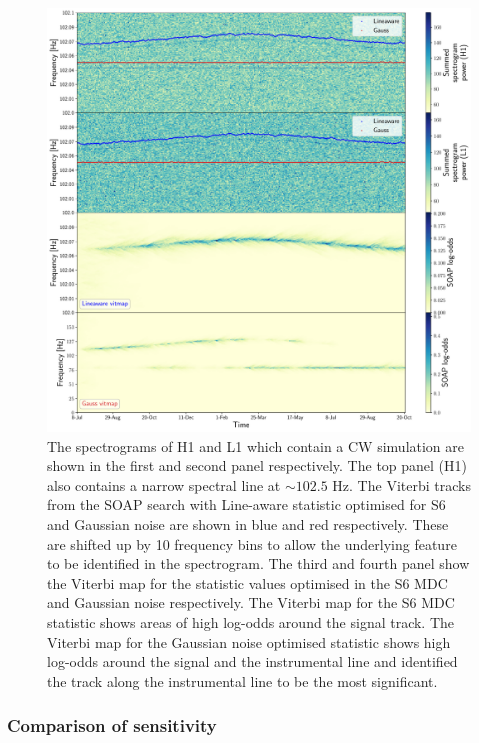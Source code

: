 \begin{figure}[h]
    \centering
    \includegraphics[width=1.0\linewidth]{C3_soap/line_example.pdf}
	\caption[Example of improvements when using optimised parameters for line aware statistic.]{ The spectrograms of H1 and L1 which contain a \gls{CW} simulation are shown in the first and second panel respectively. The top panel (H1) also contains a narrow spectral line at $\sim 102.5$ Hz.
	The Viterbi tracks from the SOAP search with Line-aware statistic optimised for S6 and Gaussian noise are shown in blue and red respectively. These are shifted up by 10 frequency bins to allow the underlying feature to be identified in the spectrogram. The third and fourth panel show the Viterbi map for the statistic values optimised in the S6 MDC and Gaussian noise respectively. The Viterbi map for the S6 \gls{MDC} statistic shows areas of high log-odds around the signal track. The Viterbi map for the Gaussian noise optimised statistic shows high log-odds around the signal and the instrumental line and identified the track along the instrumental line to be the most significant.}
    \label{soap:las:optimisation:vitexample}
\end{figure}

\subsubsection{\label{soap:las:optimisation:comp_sens}Comparison of sensitivity}

